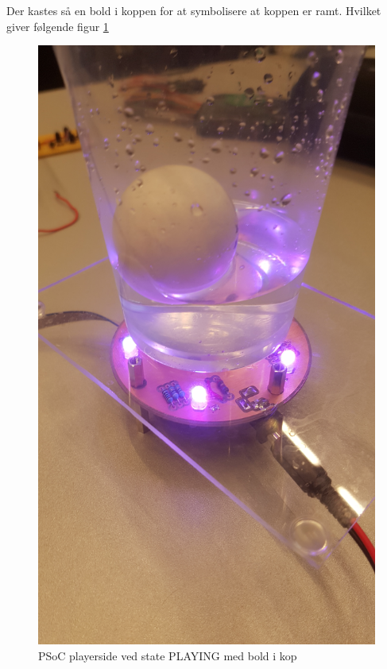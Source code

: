 \documentclass[Integrationstest/Integrationstest_main.tex]{subfiles}
\begin{document}
Der kastes så en bold i koppen for at symbolisere at koppen er ramt. Hvilket giver følgende figur \ref{fig:int_playerside_playing_ball}
\begin{figure}[H]
    \centering
    \includegraphics[width=\textwidth]{Integrationstest/Integrationstest_PlayerSide/graphics/CupSensorInt/PLAYING_blink.jpg}
    \caption{PSoC playerside ved state PLAYING med bold i kop}
    \label{fig:int_playerside_playing_ball}
\end{figure}
\end{document}
